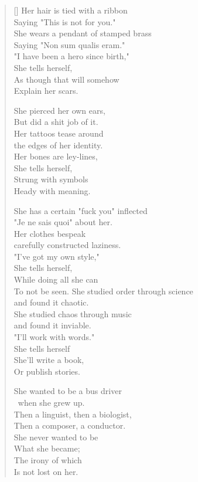 \begin{verse}[\textwidth]
Her hair is tied with a ribbon\\
\vin Saying "This is not for you."\\
She wears a pendant of stamped brass\\
\vin Saying "Non sum qualis eram."\\
"I have been a hero since birth,"\\
\vin She tells herself,\\
\vin \vin As though that will somehow\\
\vin \vin \vin Explain her scars.

She pierced her own ears,\\
\vin But did a shit job of it.\\
Her tattoos tease around\\
\vin the edges of her identity.\\
Her bones are ley-lines,\\
\vin She tells herself,\\
\vin \vin Strung with symbols\\
\vin \vin \vin Heady with meaning.

She has a certain "fuck you" inflected\\
\vin "Je ne sais quoi" about her.\\
Her clothes bespeak\\
\vin carefully constructed laziness.\\
"I've got my own style,"\\
\vin She tells herself,\\
\vin \vin While doing all she can\\
\vin \vin \vin To not be seen.
\newpage
She studied order through science\\
\vin and found it chaotic.\\
She studied chaos through music\\
\vin and found it inviable.\\
"I'll work with words."\\
\vin She tells herself\\
\vin \vin She'll write a book,\\
\vin \vin \vin Or publish stories.

She wanted to be a bus driver\\\
\vin when she grew up.\\
Then a linguist, then a biologist,\\
\vin Then a composer, a conductor.\\
She never wanted to be\\
\vin What she became;\\
\vin \vin The irony of which\\
\vin \vin \vin Is not lost on her.
\end{verse}
